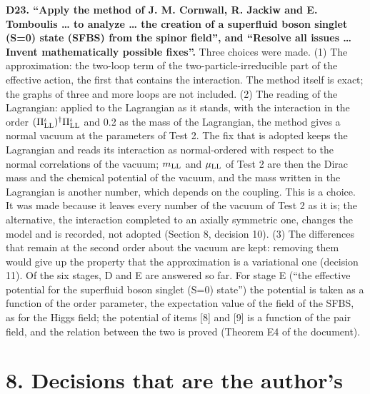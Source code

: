 \documentclass[
  10pt,
]{article}
\begin{document}
\textbf{D23. ``Apply the method of J. M. Cornwall, R. Jackiw and E.
Tomboulis \ldots{} to analyze \ldots{} the creation of a superfluid
boson singlet (S=0) state (SFBS) from the spinor field'', and ``Resolve
all issues \ldots{} Invent mathematically possible fixes''.} Three
choices were made. (1) The approximation: the two-loop term of the
two-particle-irreducible part of the effective action, the first that
contains the interaction. The method itself is exact; the graphs of
three and more loops are not included. (2) The reading of the
Lagrangian: applied to the Lagrangian as it stands, with the interaction
in the order \((\Pi^\iota_{\rm LL})^\dagger\Pi^\iota_{\rm LL}\) and 0.2
as the mass of the Lagrangian, the method gives a normal vacuum at the
parameters of Test 2. The fix that is adopted keeps the Lagrangian and
reads its interaction as normal-ordered with respect to the normal
correlations of the vacuum; \(m_{\rm LL}\) and \(\mu_{\rm LL}\) of Test
2 are then the Dirac mass and the chemical potential of the vacuum, and
the mass written in the Lagrangian is another number, which depends on
the coupling. This is a choice. It was made because it leaves every
number of the vacuum of Test 2 as it is; the alternative, the
interaction completed to an axially symmetric one, changes the model and
is recorded, not adopted (Section 8, decision 10). (3) The differences
that remain at the second order about the vacuum are kept: removing them
would give up the property that the approximation is a variational one
(decision 11). Of the six stages, D and E are answered so far. For stage
E (``the effective potential for the superfluid boson singlet (S=0)
state'') the potential is taken as a function of the order parameter,
the expectation value of the field of the SFBS, as for the Higgs field;
the potential of items {[}8{]} and {[}9{]} is a function of the pair
field, and the relation between the two is proved (Theorem E4 of the
document).

\hypertarget{decisions-that-are-the-authors}{%
\section{8. Decisions that are the
author's}\label{decisions-that-are-the-authors}}
\end{document}
